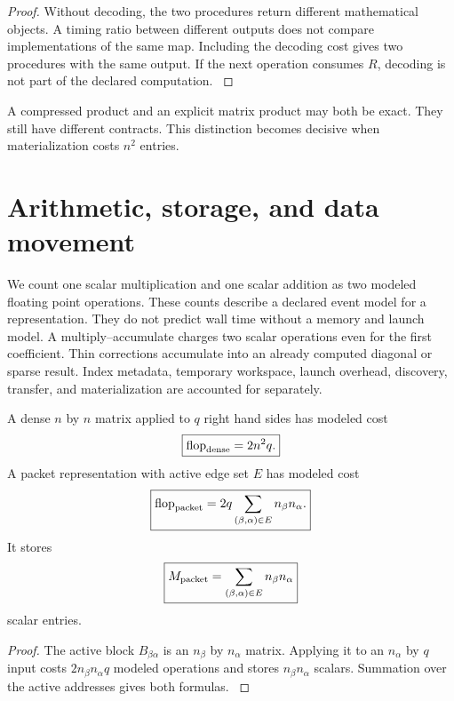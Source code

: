 \begin{proof}\label{main:proof:004}
Without decoding, the two procedures return different mathematical objects. A timing ratio between different outputs does not compare implementations of the same map. Including the decoding cost gives two procedures with the same output. If the next operation consumes \(R\), decoding is not part of the declared computation.
\label{main:proof:004:end}\end{proof}

\begin{remark}\label{main:remark:001}\label{rem:semantic_boundary}
A compressed product and an explicit matrix product may both be exact. They still have different contracts. This distinction becomes decisive when materialization costs \(n^2\) entries.
\end{remark}

\section{Arithmetic, storage, and data movement}\label{main:section:003}\label{sec:cost}

We count one scalar multiplication and one scalar addition as two modeled floating point operations. These counts describe a declared event model for a representation. They do not predict wall time without a memory and launch model. A multiply--accumulate charges two scalar operations even for the first coefficient. Thin corrections accumulate into an already computed diagonal or sparse result. Index metadata, temporary workspace, launch overhead, discovery, transfer, and materialization are accounted for separately.

\begin{theorem}\label{main:theorem:003}\label{thm:packet_counts}
A dense \(n\) by \(n\) matrix applied to \(q\) right hand sides has modeled cost
\[
\boxed{
\operatorname{flop}_{\rm dense}=2n^2q.
}
\]
A packet representation with active edge set \(E\) has modeled cost
\[
\boxed{
\operatorname{flop}_{\rm packet}
=
2q
\sum_{(\beta,\alpha)\in E}
n_\beta n_\alpha.
}
\]
It stores
\[
\boxed{
M_{\rm packet}
=
\sum_{(\beta,\alpha)\in E}
n_\beta n_\alpha
}
\]
scalar entries.
\end{theorem}

\begin{proof}\label{main:proof:005}
The active block \(B_{\beta\alpha}\) is an \(n_\beta\) by \(n_\alpha\) matrix. Applying it to an \(n_\alpha\) by \(q\) input costs \(2n_\beta n_\alpha q\) modeled operations and stores \(n_\beta n_\alpha\) scalars. Summation over the active addresses gives both formulas.
\label{main:proof:005:end}\end{proof}

